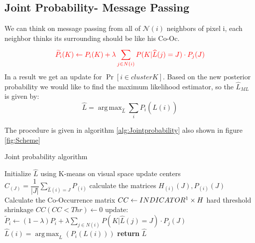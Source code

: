 \documentclass{article}
\DeclareMathOperator*{\argmax}{arg\,max}
\begin{document}
\subsection{Joint Probability- Message Passing}
We can think on message passing from all of $\mathcal{N}(i)$ neighbors of pixel i, each neighbor thinks its surrounding should be like his Co-Oc.
\begin{equation}
\color{red}
\widetilde{P}_i(K) \leftarrow P_i(K) + \lambda\sum_{j\in N(i)}^{} P(K|\widehat{L}(j)=J)\cdot P_{j}(J)
\end{equation}
In a result we get an update for $ \Pr [i \in cluster K] $. Based on the new posterior probability we would like to find the maximum likelihood estimator, so the $ \hat{L}_{ML} $ is given by:
$$ \hat{L}=\argmax _{\hat{L}} \sum_{i}^{}P_i(\widehat{L}(i)) $$

The procedure is given in algorithm \eqref{alg:Jointprobability} also shown in figure \ref{fig:Scheme}

\begin{algorithm}[!h] 
	\caption{Joint probability algorithm}\label{alg:Jointprobability}
	\begin{algorithmic}
		\State Initialize $\hat L$ using K-means on visual space
		\Loop
		\State update centers $C_{(J)}=\dfrac{1}{|J|} \sum_{\widehat{L}(i)=J}^{}P_{(i)}$
		\State calculate the matrices $ H_{(i)}(J),P_{(i)}(J) $
		\State Calculate the Co-Occurrence matrix  $ CC\gets INDICATOR\footnotemark\times H $
		\State hard threshold shrinkage $ CC(CC<Thr)\gets 0 $ 
		\State update: $ \widetilde{P}_i \leftarrow (1-\lambda)P_i + \lambda\sum_{j\in N(i)}^{} P(K|\hat{L}(j)=J)\cdot P_{j}(J) $
		\State $ \hat{L}(i)=\argmax _L(  P_i(L(i))  ) $
		\EndLoop
		\State \textbf{return} $\hat{L}$
		
	\end{algorithmic}
\end{algorithm}

\end{document}
